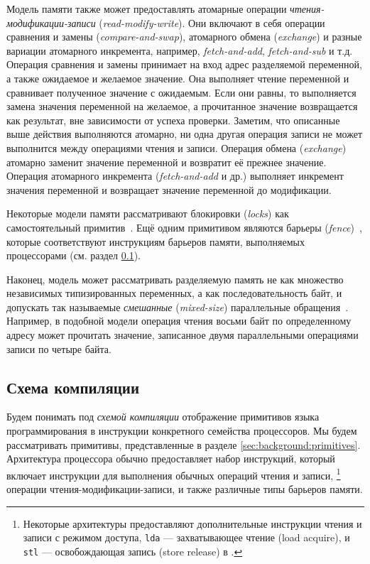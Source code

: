 Модель памяти также может предоставлять атомарные операции 
\emph{чтения-модификации-записи} (\emph{read-modify-write}).
Они включают в себя операции сравнения и замены (\emph{compare-and-swap}), 
атомарного обмена (\emph{exchange}) и разные вариации атомарного инкремента, 
например, \emph{fetch-and-add}, \emph{fetch-and-sub} и т.д. 
Операция сравнения и замены принимает на вход 
адрес разделяемой переменной, а также ожидаемое и желаемое значение.
Она выполняет чтение переменной и сравнивает полученное значение 
с ожидаемым. Если они равны, то выполняется замена значения переменной 
на желаемое, а прочитанное значение возвращается как результат, 
вне зависимости от успеха проверки. 
Заметим, что описанные выше действия выполняются атомарно, 
ни одна другая операция записи не может выполнится между 
операциями чтения и записи.
Операция обмена (\emph{exchange}) атомарно 
заменит значение переменной и возвратит её прежнее значение. 
Операция атомарного инкремента (\emph{fetch-and-add} и др.) 
выполняет инкремент значения переменной и
возвращает значение переменной до модификации.  

Некоторые модели памяти рассматривают 
блокировки (\emph{locks}) как самостоятельный примитив~\cite{Manson-al:POPL05}. 
Ещё одним примитивом являются барьеры (\emph{fence})~\cite{Batty-al:POPL11},
которые соответствуют инструкциям барьеров памяти, 
выполняемых процессорами  
(см. раздел \cref{sec:background:compile}). 

Наконец, модель может рассматривать разделяемую память 
не как множество независимых типизированных переменных, 
а как последовательность байт, и допускать 
так называемые \emph{смешанные} (\emph{mixed-size}) 
параллельные обращения~\cite{Flur-al:POPL17}. 
Например, в подобной модели операция чтения восьми байт по определенному адресу
может прочитать значение, записанное двумя параллельными 
операциями записи по четыре байта.

\subsection{Схема компиляции}
\label{sec:background:compile}

Будем понимать под \emph{схемой компиляции} отображение
примитивов языка программирования в инструкции 
конкретного семейства процессоров.  
Мы будем рассматривать примитивы, представленные в 
разделе \cref{sec:background:primitives}.
Архитектура процессора обычно предоставляет 
набор инструкций, который включает 
инструкции для выполнения обычных операций чтения и записи,%
\footnote{Некоторые архитектуры
предоставляют дополнительные инструкции чтения и 
записи с режимом доступа, \eg 
\eg \texttt{lda} --- захватывающее чтение (load acquire), 
и \texttt{stl} --- освобождающая запись (store release) в .} 
операции чтения-модификации-записи, и 
также различные типы барьеров памяти.

